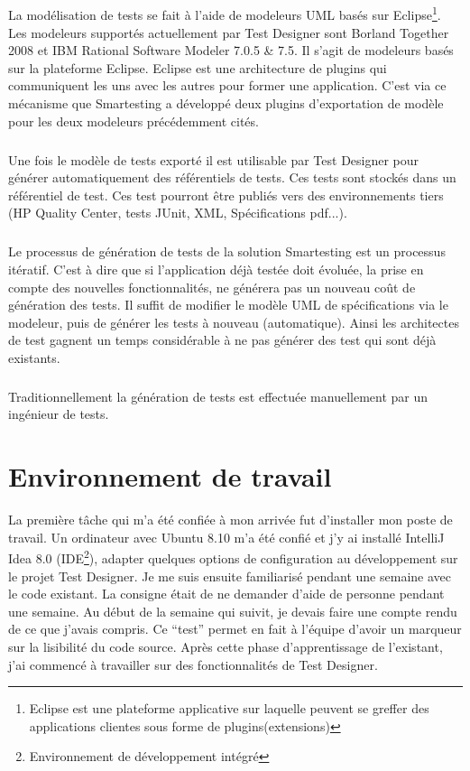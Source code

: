 \subparagraph*{}
La modélisation de tests se fait à l'aide de modeleurs UML basés sur Eclipse\footnote{Eclipse est une plateforme applicative sur laquelle peuvent se greffer des applications clientes sous forme de plugins(extensions)}. Les modeleurs supportés actuellement par Test Designer sont Borland Together 2008 et IBM Rational Software Modeler 7.0.5 \& 7.5. Il s'agit de modeleurs basés sur la plateforme Eclipse. Eclipse est une architecture de plugins qui communiquent les uns avec les autres pour former une application. C'est via ce mécanisme que Smartesting a développé deux plugins d'exportation de modèle pour les deux modeleurs précédemment cités.

\subparagraph*{}
Une fois le modèle de tests exporté il est utilisable par Test Designer pour générer automatiquement des référentiels de tests. Ces tests sont stockés dans un référentiel de test. Ces test pourront être publiés vers des environnements tiers (HP Quality Center, tests JUnit, XML, Spécifications pdf...).

\subparagraph*{}
Le processus de génération de tests de la solution Smartesting est un processus itératif. C'est à dire que si l'application déjà testée doit évoluée, la prise en compte des nouvelles fonctionnalités, ne générera pas un nouveau coût de génération des tests. 
Il suffit de modifier le modèle UML de spécifications via le modeleur, puis de générer les tests à nouveau (automatique). Ainsi les architectes de test gagnent un temps considérable à ne pas générer des test qui sont déjà existants.

\subparagraph*{}
Traditionnellement la génération de tests est effectuée manuellement par un ingénieur de tests.

\section{Environnement de travail}
La première tâche qui m'a été confiée à mon arrivée fut d'installer mon poste de travail. Un ordinateur avec Ubuntu 8.10 m'a été confié et j'y ai installé IntelliJ Idea 8.0 (IDE\footnote{Environnement de développement intégré}), adapter quelques options de configuration au développement sur le projet Test Designer. Je me suis ensuite familiarisé pendant une semaine avec le code existant. La consigne était de ne demander d'aide de personne pendant une semaine. Au début de la semaine qui suivit, je devais faire une compte rendu de ce que j'avais compris. Ce ``test'' permet en fait à l'équipe d'avoir un  marqueur sur la lisibilité du code source. Après cette phase d'apprentissage de l'existant, j'ai commencé à travailler sur des fonctionnalités de Test Designer.

